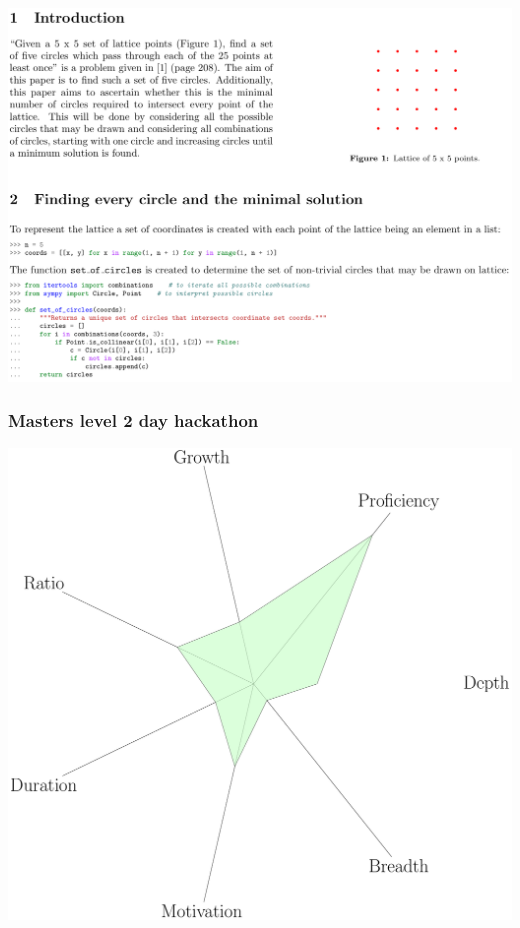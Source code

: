 \documentclass{beamer}
\begin{document}
    \begin{frame}
        \centering
        \includegraphics[width=.9\textwidth]{static/screenshots/cfm_cw.png}
    \end{frame}

    \begin{frame}
        \frametitle{Masters level 2 day hackathon}
        \centering
        \includegraphics[height=.8\textheight]{static/hackathon/main.pdf}
    \end{frame}
\end{document}
